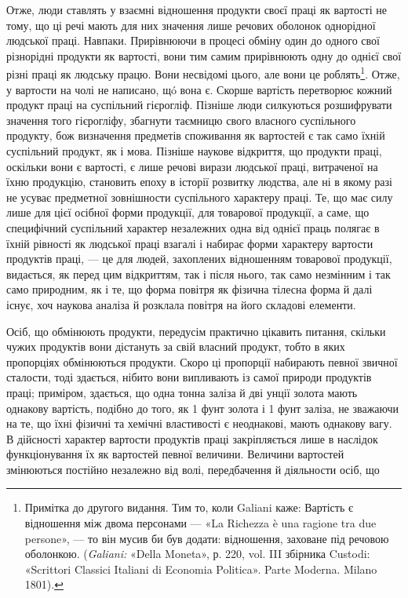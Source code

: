 Отже, люди ставлять у взаємні відношення продукти своєї
праці як вартості не тому, що ці речі мають для них значення лише
речових оболонок однорідної людської праці. Навпаки. Прирівнюючи
в процесі обміну один до одного свої різнорідні продукти
як вартості, вони тим самим прирівнюють одну до однієї свої
різні праці як людську працю. Вони несвідомі цього, але вони
це роблять\footnote{
Примітка до другого видання. Тим то, коли Galiani каже: Вартість
є відношення між двома персонами — «La Richezza è una ragione
tra due persone», — то він мусив би був додати: відношення, заховане під
речовою оболонкою. (\emph{Galiani:} «Della Moneta», р. 220, vol. III збірника
Custodi: «Scrittori Classici Italiani di Economia Politica». Parte
Moderna. Milano 1801).
}. Отже, у вартости на чолі не написано, щó вона є.
Скорше вартість перетворює кожний продукт праці на суспільний
гієрогліф. Пізніше люди силкуються розшифрувати значення того
гієрогліфу, збагнути таємницю свого власного суспільного продукту,
бож визначення предметів споживання як вартостей є
так само їхній суспільний продукт, як і мова. Пізніше наукове
відкриття, що продукти праці, оскільки вони є вартості, є лише
речові вирази людської праці, витраченої на їхню продукцію,
становить епоху в історії розвитку людства, але ні в якому разі
не усуває предметної зовнішности суспільного характеру праці.
Те, що має силу лише для цієї осібної форми продукції, для товарової
продукції, а саме, що специфічний суспільний характер
незалежних одна від однієї праць полягає в їхній рівності як
людської праці взагалі і набирає форми характеру вартости продуктів
праці, — це для людей, захоплених відношенням товарової
продукції, видається, як перед цим відкриттям, так і після нього,
так само незмінним і так само природним, як і те, що форма повітря
як фізична тілесна форма й далі існує, хоч наукова аналіза
й розклала повітря на його складові елементи.

Осіб, що обмінюють продукти, передусім практично цікавить
питання, скільки чужих продуктів вони дістануть за свій власний
продукт, тобто в яких пропорціях обмінюються продукти. Скоро
ці пропорції набирають певної звичної сталости, тоді здається,
нібито вони випливають із самої природи продуктів праці; приміром,
здається, що одна тонна заліза й дві унції золота мають однакову
вартість, подібно до того, як 1 фунт золота і 1 фунт заліза, не
зважаючи на те, що їхні фізичні та хемічні властивості є неоднакові,
мають однакову вагу. В дійсності характер вартости продуктів
праці закріпляється лише в наслідок функціонування їх як
вартостей певної величини. Величини вартостей змінюються постійно
незалежно від волі, передбачення й діяльности осіб, що
\parbreak{}  %
